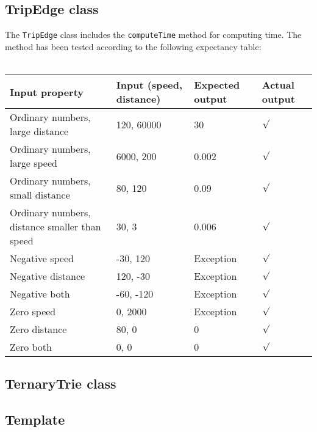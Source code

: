 \documentclass[a4paper,11pt]{article}
\begin{document}
\pagebreak
\subsection{TripEdge class}
\label{sec:TripEdge class}
The \texttt{TripEdge} class includes the \texttt{computeTime} method for computing time. The method has been tested according to the following expectancy table: \\ \\
\begin{tabular}{ p{3.5cm} | p{2.5cm} | p{2.5cm} | p{2.5cm} }
	Input property & Input (speed, distance) & Expected output & Actual output \\
	\hline
	Ordinary numbers, large distance & 120, 60000 & 30 & $\surd$ \\
	Ordinary numbers, large speed & 6000, 200 & 0.002 & $\surd$ \\
	Ordinary numbers, small distance & 80, 120 & 0.09 & $\surd$ \\
	Ordinary numbers, distance smaller than speed & 30, 3 & 0.006 & $\surd$ \\
	Negative speed & -30, 120 & Exception & $\surd$ \\
	Negative distance & 120, -30 & Exception & $\surd$ \\
	Negative both & -60, -120 & Exception & $\surd$ \\
	Zero speed & 0, 2000 & Exception & $\surd$ \\
	Zero distance & 80, 0 & 0 & $\surd$ \\
	Zero both & 0, 0 & 0 & $\surd$
\end{tabular}

\pagebreak
\subsection{TernaryTrie class}
%



\pagebreak
\subsection{Template}
\end{document}
